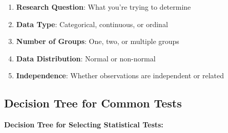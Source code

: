 \documentclass[
  letterpaper,
]{book}
\providecommand{\tightlist}{%
  \setlength{\itemsep}{0pt}\setlength{\parskip}{0pt}}
\begin{document}
\begin{enumerate}
\def\labelenumi{\arabic{enumi}.}
\tightlist
\item
  \textbf{Research Question}: What you're trying to determine
\item
  \textbf{Data Type}: Categorical, continuous, or ordinal
\item
  \textbf{Number of Groups}: One, two, or multiple groups
\item
  \textbf{Data Distribution}: Normal or non-normal
\item
  \textbf{Independence}: Whether observations are independent or related
\end{enumerate}

\subsection{Decision Tree for Common
Tests}\label{decision-tree-for-common-tests}

\textbf{Decision Tree for Selecting Statistical Tests:}
\end{document}
